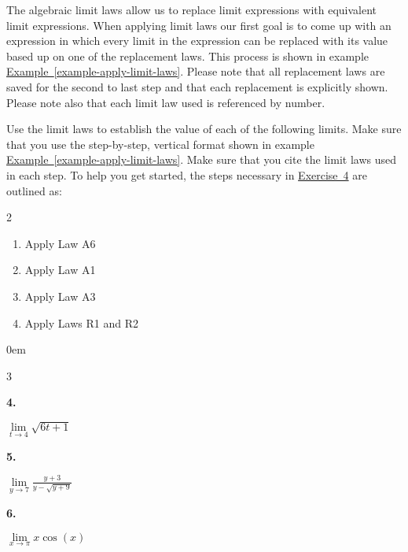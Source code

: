 \documentclass[12pt,]{book}
\theoremstyle{plain}
\theoremstyle{definition}
\numberwithin{equation}{section}
\newenvironment{exercisegroup}%
{\medskip\noindent}%
{\par\bigskip}%
\newlength{\exercisegroupindent}%
\newlength{\exercisegroupitemwidth}%
\newenvironment{exercisegrouplist}%
{\vspace{-\partopsep}%
\begin{adjustwidth}{\exercisegroupindent}{0em}}%
{\end{adjustwidth}%
\vspace{-\partopsep}%
\vspace{\baselineskip}}%
\newenvironment{exercisegroupbycol}[1]%
{\begin{exercisegrouplist}%
\vspace{-\multicolsep}%
\begin{multicols}{#1}%
\setlength{\parindent}{0em}%
\setlength{\exercisegroupitemwidth}{\linewidth}}%
{\end{multicols}%
\vspace{-\multicolsep}%
\end{exercisegrouplist}}%
\newenvironment{exercisegroupitem}[1]%
{\begin{minipage}[t]{\exercisegroupitemwidth}
\vspace{0pt}%
{\bfseries#1}%
\rule{0pt}{\baselineskip}}{\strut%
\end{minipage}%
\hspace{\columnsep}}%
\providecommand\phantomsection{}
\begin{document}
\begin{exercisegroup}%
The algebraic limit laws allow us to replace limit expressions with equivalent limit expressions. When applying limit laws our first goal is to come up with an expression in which every limit in the expression can be replaced with its value based up on one of the replacement laws. This process is shown in example \hyperref[example-apply-limit-laws]{Example~\ref*{example-apply-limit-laws}}. Please note that all replacement laws are saved for the second to last step and that each replacement is explicitly shown. Please note also that each limit law used is referenced by number.%
\par
Use the limit laws to establish the value of each of the following limits. Make sure that you use the step-by-step, vertical format shown in example \hyperref[example-apply-limit-laws]{Example~\ref*{example-apply-limit-laws}}. Make sure that you cite the limit laws used in each step. To help you get started, the steps necessary in \hyperref[exercise-first-apply-limit-laws]{Exercise~4} are outlined as:%
\begin{multicols}{2}
\begin{enumerate}[label=(\alph*)]
\item{}Apply Law A6\item{}Apply Law A1\item{}Apply Law A3\item{}Apply Laws R1 and R2\end{enumerate}
\end{multicols}
\begin{exercisegroupbycol}{3}%
\begin{exercisegroupitem}{4. }\phantomsection\hypertarget{exercise-first-apply-limit-laws}{\null}
\(\lim\limits_{t\to4}\sqrt{6t+1}\)%
\end{exercisegroupitem}%
\par%
\begin{exercisegroupitem}{5. }\phantomsection\hypertarget{exercise-54}{\null}
\(\lim\limits_{y\to7}\frac{y+3}{y-\sqrt{y+9}}\)%
\end{exercisegroupitem}%
\par%
\begin{exercisegroupitem}{6. }\phantomsection\hypertarget{exercise-55}{\null}
\(\lim\limits_{x\to\pi}x\cos(x)\)%
\end{exercisegroupitem}%
\par%
\end{exercisegroupbycol}%
\end{exercisegroup}%
\typeout{************************************************}
\typeout{************************************************}
\end{document}
